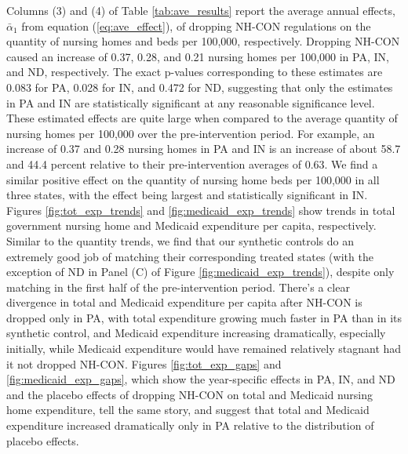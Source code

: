 \documentclass[../Main.tex]{subfiles}
\begin{document}
\indent Columns (3) and (4) of Table \ref{tab:ave_results} report the average annual effects, $\bar{\alpha}_1$ from equation (\ref{eq:ave_effect}), of dropping NH-CON regulations on the quantity of nursing homes and beds per 100,000, respectively. Dropping NH-CON caused an increase of 0.37, 0.28, and 0.21 nursing homes per 100,000 in PA, IN, and ND, respectively. The exact p-values corresponding to these estimates are 0.083 for PA, 0.028 for IN, and 0.472 for ND, suggesting that only the estimates in PA and IN are statistically significant at any reasonable significance level. These estimated effects are quite large when compared to the average quantity of nursing homes per 100,000 over the pre-intervention period. For example, an increase of 0.37 and 0.28 nursing homes in PA and IN is an increase of about 58.7 and 44.4 percent relative to their pre-intervention averages of 0.63. We find a similar positive effect on the quantity of nursing home beds per 100,000 in all three states, with the effect being largest and statistically significant in IN.\\
\indent Figures \ref{fig:tot_exp_trends} and \ref{fig:medicaid_exp_trends} show trends in total government nursing home and Medicaid expenditure per capita, respectively. Similar to the quantity trends, we find that our synthetic controls do an extremely good job of matching their corresponding treated states (with the exception of ND in Panel (C) of Figure \ref{fig:medicaid_exp_trends}), despite only matching in the first half of the pre-intervention period. There's a clear divergence in total and Medicaid expenditure per capita after NH-CON is dropped only in PA, with total expenditure growing much faster in PA than in its synthetic control, and Medicaid expenditure increasing dramatically, especially initially, while Medicaid expenditure would have remained relatively stagnant had it not dropped NH-CON. Figures \ref{fig:tot_exp_gaps} and \ref{fig:medicaid_exp_gaps}, which show the year-specific effects in PA, IN, and ND and the placebo effects of dropping NH-CON on total and Medicaid nursing home expenditure, tell  the same story, and suggest that total and Medicaid expenditure increased dramatically only in PA relative to the distribution of placebo effects.\\
\end{document}
